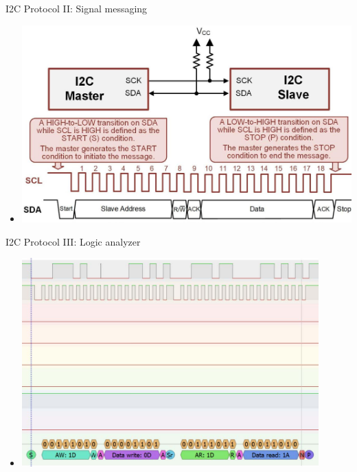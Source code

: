 \begin{frame}{I2C Protocol II: Signal messaging}
    \begin{itemize}
        \item \includegraphics[width=\textwidth]{trainingmaterials/i2c/i2c-signals.jpg}
    \end{itemize}
\end{frame}

\begin{frame}{I2C Protocol III: Logic analyzer}
    \begin{itemize}
        \item \includegraphics[width=0.9\textwidth]{trainingmaterials/i2c/i2c-signal-logic-analyzer.jpg}
    \end{itemize}
\end{frame}

